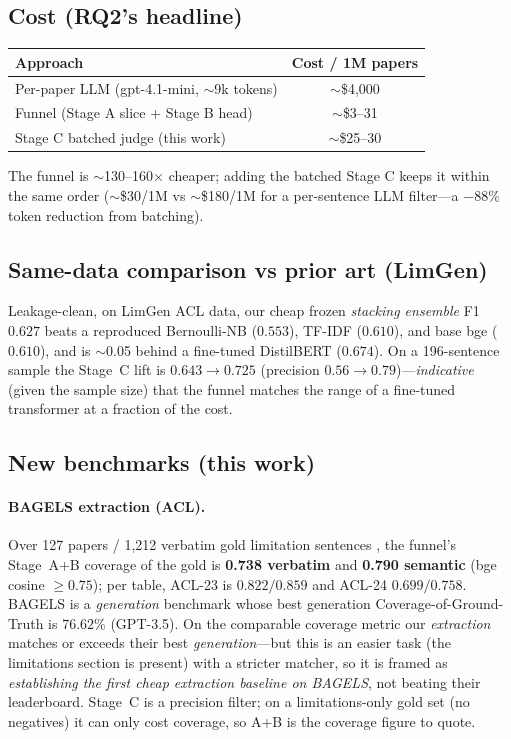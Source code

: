 \subsection{Cost (RQ2's headline)}

\begin{table}[h]
\centering
\begin{tabular}{@{}lc@{}}
\toprule
Approach & Cost / 1M papers \\
\midrule
Per-paper LLM (gpt-4.1-mini, $\sim$9k tokens) & $\sim$\$4{,}000 \\
Funnel (Stage A slice + Stage B head) & $\sim$\$3--31 \\
Stage C batched judge (this work) & $\sim$\$25--30 \\
\bottomrule
\end{tabular}
\end{table}

The funnel is $\sim$130--160$\times$ cheaper; adding the batched Stage C keeps it
within the same order ($\sim$\$30/1M vs $\sim$\$180/1M for a per-sentence LLM
filter---a $-88\%$ token reduction from batching).

\subsection{Same-data comparison vs prior art (LimGen)}
Leakage-clean, on LimGen ACL data, our cheap frozen \emph{stacking ensemble} F1
$0.627$ beats a reproduced Bernoulli-NB \citep{zhangfws2022} ($0.553$), TF-IDF
($0.610$), and base bge ($0.610$), and is $\sim$0.05 behind a fine-tuned
DistilBERT ($0.674$). On a 196-sentence sample the Stage~C lift is
$0.643 \rightarrow 0.725$ (precision $0.56 \rightarrow 0.79$)---\emph{indicative}
(given the sample size) that the funnel matches the range of a fine-tuned
transformer at a fraction of the cost.

\subsection{New benchmarks (this work)}

\paragraph{BAGELS extraction (ACL).} Over 127 papers / 1{,}212 verbatim gold
limitation sentences \citep{bagels}, the funnel's Stage~A+B coverage of the gold
is \textbf{0.738 verbatim} and \textbf{0.790 semantic} (bge cosine $\geq 0.75$);
per table, ACL-23 is $0.822/0.859$ and ACL-24 $0.699/0.758$. BAGELS is a
\emph{generation} benchmark whose best generation Coverage-of-Ground-Truth is
$76.62\%$ (GPT-3.5). On the comparable coverage metric our \emph{extraction}
matches or exceeds their best \emph{generation}---but this is an easier task
(the limitations section is present) with a stricter matcher, so it is framed as
\emph{establishing the first cheap extraction baseline on BAGELS}, not beating
their leaderboard. Stage~C is a precision filter; on a limitations-only gold set
(no negatives) it can only cost coverage, so A+B is the coverage figure to quote.

